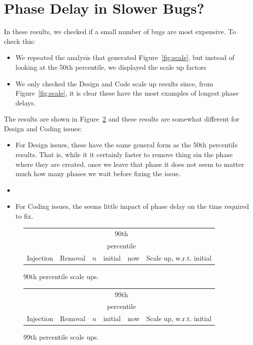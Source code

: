 \documentclass{sig-alternate}
\newcommand{\bi}{\begin{itemize}[leftmargin=0.4cm]}
\newcommand{\ei}{\end{itemize}}
\newcommand{\fig}[1]{Figure~\ref{fig:#1}}
\def\baselinestretch{1}
\begin{document}
\section{Phase Delay in Slower Bugs?}
In these results, we checked if a small number of bugs are most expensive. 
To check this:
\bi
\item
We repeated the analysis that generated \fig{scale},
but instead of looking at the 50th percentile, we displayed the scale up factors
\item 
We only
checked the Design and Code scale up results since, from \fig{scale}, it is clear these
have the most examples of longest phase delays.
\ei 
The  results are shown in \fig{scale90} and these
results are somewhat different for Design and Coding issues: 
\bi 
\item For Design issues,  these have the same
general form as the 50th percentile results. That is, while it it certainly faster
to remove thing sin the phase where they are created, once we leave that phase
it does not seem to matter much how many phases we wait before fixing the issue.
\item
\item For Coding issues, the seems little impact of phase delay on the time
required to fix.
\ei


\begin{figure}[!t]
\renewcommand{\baselinestretch}{0.7}
\scriptsize
\begin{center}
\begin{tabular}{l@{~~}|l@{~}|r@{~}|r@{~}r@{~}|r@{~}l}
           \multicolumn{2}{c}{~}                 &  &\multicolumn{2}{c|}{90th }\\
           \multicolumn{2}{c}{~}                 &  &\multicolumn{2}{c|}{percentile }\\
  Injection&   Removal& $n$ & initial & now & \multicolumn{2}{l}{Scale up, w.r.t. initial}

\end{tabular}
\end{center}
\caption{90th percentile scale ups.}
\label{fig:scale90}
\end{figure}


\begin{figure}[!t]
\renewcommand{\baselinestretch}{0.7}
\scriptsize
\begin{center}
\begin{tabular}{l@{~~}|l@{~}|r@{~}|r@{~}r@{~}|r@{~}l}
          \multicolumn{2}{c}{~}                 &  &\multicolumn{2}{c|}{99th }\\
           \multicolumn{2}{c}{~}                 &  &\multicolumn{2}{c|}{percentile }\\
  Injection&   Removal& $n$ & initial & now & \multicolumn{2}{l}{Scale up, w.r.t. initial}

\end{tabular}
\end{center}
\caption{99th percentile scale ups.}
\label{fig:scale90}
\end{figure}
\end{document}
